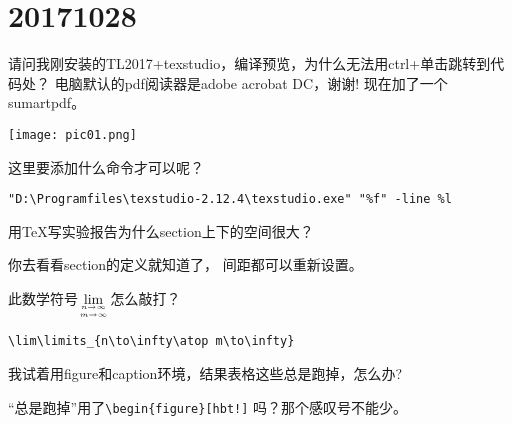 \documentclass[QAofGroup.tex]{subfiles}
\begin{document}
%
%

\chapter{20171028}\label{ch1028}

\begin{qst}\label{Q2017102801}
请问我刚安装的TL2017+texstudio，编译预览，为什么无法用ctrl+单击跳转到代码处？
电脑默认的pdf阅读器是adobe acrobat DC，谢谢!
现在加了一个sumartpdf。

\texttt{[image: pic01.png]}

这里要添加什么命令才可以呢？
\end{qst}
\ans \verb|"D:\Programfiles\texstudio-2.12.4\texstudio.exe" "%f" -line %l|

\begin{qst}\label{Q2017102802}
用TeX写实验报告为什么section上下的空间很大？
\end{qst}
\ans 你去看看section的定义就知道了， 间距都可以重新设置。

\begin{qst}\label{Q2017102803}
此数学符号$\displaystyle\lim\limits_{n\to\infty\atop m\to\infty}$怎么敲打？
\end{qst}
\ans \verb|\lim\limits_{n\to\infty\atop m\to\infty}|

\begin{qst}\label{Q2017102804}
我试着用figure和caption环境，结果表格这些总是跑掉，怎么办?
\end{qst}
\ans “总是跑掉”用了\verb|\begin{figure}[hbt!]| 吗？那个感叹号不能少。
\end{document}
